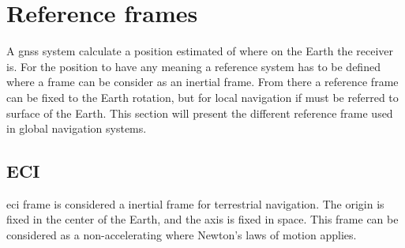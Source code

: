 \section{Reference frames}
A \gls{gnss} system calculate a position estimated of where on the Earth the receiver is. For the position to have any meaning a reference system has to be defined where a frame can be consider as an inertial frame. From there a reference frame can be fixed to the Earth rotation, but for local navigation if must be referred to surface of the Earth. This section will present the different reference frame used in global navigation systems.
\subsection{ECI}
\gls{eci} frame is considered a inertial frame for terrestrial navigation. The origin is fixed in the center of the Earth, and the axis is fixed in space. This frame can be considered as a non-accelerating where Newton's laws of motion applies. 
